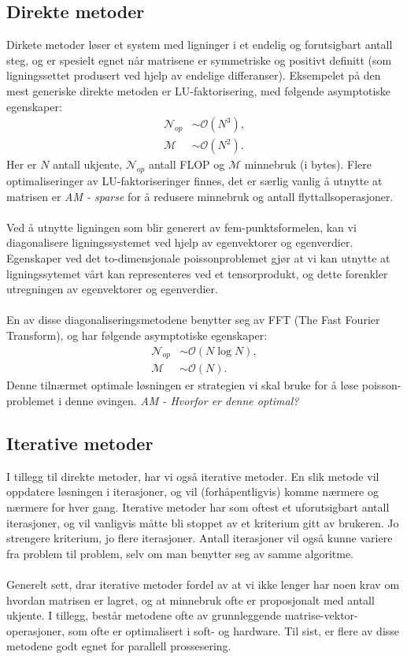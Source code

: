 \documentclass{article}
\begin{document}
\subsection{Direkte metoder}
Dirkete metoder løser et system med ligninger i et endelig og forutsigbart antall steg, og er spesielt egnet når matrisene er symmetriske og positivt definitt (som ligningssettet produsert ved hjelp av endelige differanser). Eksempelet på den mest generiske direkte metoden er LU-faktorisering, med følgende asymptotiske egenskaper:
\begin{align*}
      \mathcal{N}_{op} &\sim \mathcal{O}(N^3), \\
      \mathcal{M} &\sim \mathcal{O}(N^2).
\end{align*}
Her er $N$ antall ukjente,  $\mathcal{N}_{op}$ antall FLOP og $\mathcal{M}$ minnebruk (i bytes). Flere optimaliseringer av LU-faktoriseringer finnes, det er særlig vanlig å utnytte at matrisen er \emph{AM - sparse} for å redusere minnebruk og antall flyttallsoperasjoner. \\
\\
Ved å utnytte ligningen som blir generert av fem-punktsformelen, kan vi diagonalisere ligningssystemet ved hjelp av egenvektorer og egenverdier. Egenskaper ved det to-dimensjonale poissonproblemet gjør at vi kan utnytte at ligningssytemet vårt kan representeres ved et tensorprodukt, og dette forenkler utregningen av egenvektorer og egenverdier.\\
\\
En av disse diagonaliseringsmetodene benytter seg av FFT (The Fast Fourier Transform), og har følgende asymptotiske egenskaper:
\begin{align*}
  \mathcal{N}_{op} &\sim \mathcal{O}(N \log N), \\
  \mathcal{M} &\sim \mathcal{O}(N).
\end{align*}
Denne tilnærmet optimale løsningen er strategien vi skal bruke for å løse poisson-problemet i denne øvingen.
\emph{AM - Hvorfor er denne optimal?}

\subsection{Iterative metoder}
I tillegg til direkte metoder, har vi også iterative metoder. En slik metode vil oppdatere løsningen i iterasjoner, og vil (forhåpentligvis) komme nærmere og nærmere for hver gang. Iterative metoder har som oftest et uforutsigbart antall iterasjoner, og vil vanligvis måtte bli stoppet av et kriterium gitt av brukeren. Jo strengere kriterium, jo flere iterasjoner. Antall iterasjoner vil også kunne variere fra problem til problem, selv om man benytter seg av samme algoritme.\\
\\
Generelt sett, drar iterative metoder fordel av at vi ikke lenger har noen krav om hvordan matrisen er lagret, og at minnebruk ofte er proposjonalt med antall ukjente. I tillegg, består metodene ofte av grunnleggende matrise-vektor-operasjoner, som ofte er optimalisert i soft- og hardware. Til sist, er flere av disse metodene godt egnet for parallell prossesering.
\end{document}
